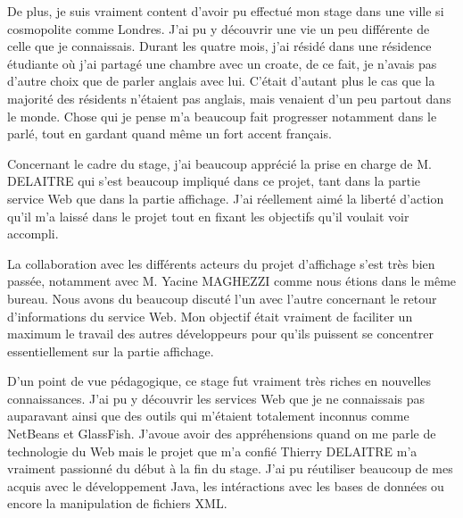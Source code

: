 De plus, je suis vraiment content d'avoir pu effectu\'e mon stage dans une ville si cosmopolite comme Londres.
J'ai pu y d\'ecouvrir une vie un peu diff\'erente de celle que je connaissais.
Durant les quatre mois, j'ai r\'esid\'e dans une r\'esidence \'etudiante o\`u j'ai partag\'e une chambre avec un croate, de ce fait, je n'avais pas d'autre choix que de parler anglais avec lui.
C'\'etait d'autant plus le cas que la majorit\'e des r\'esidents n'\'etaient pas anglais, mais venaient d'un peu partout dans le monde.
Chose qui je pense m'a beaucoup fait progresser notamment dans le parl\'e, tout en gardant quand m\^eme un fort accent fran\c{c}ais.

Concernant le cadre du stage, j'ai beaucoup appr\'eci\'e la prise en charge de M. DELAITRE qui s'est beaucoup impliqu\'e dans ce projet, tant dans la partie service Web que dans la partie affichage.
J'ai r\'eellement aim\'e la libert\'e d'action qu'il m'a laiss\'e dans le projet tout en fixant les objectifs qu'il voulait voir accompli.

La collaboration avec les diff\'erents acteurs du projet d'affichage s'est tr\`es bien pass\'ee, notamment avec M. Yacine MAGHEZZI comme nous \'etions dans le m\^eme bureau.
Nous avons du beaucoup discut\'e l'un avec l'autre concernant le retour d'informations du service Web.
Mon objectif \'etait vraiment de faciliter un maximum le travail des autres d\'eveloppeurs pour qu'ils puissent se concentrer essentiellement sur la partie affichage.

D'un point de vue p\'edagogique, ce stage fut vraiment tr\`es riches en nouvelles connaissances.
J'ai pu y d\'ecouvrir les services Web que je ne connaissais pas auparavant ainsi que des outils qui m'\'etaient totalement inconnus comme NetBeans et GlassFish.
J'avoue avoir des appr\'ehensions quand on me parle de technologie du Web mais le projet que m'a confi\'e Thierry DELAITRE m'a vraiment passionn\'e du d\'ebut \`a la fin du stage.
J'ai pu r\'eutiliser beaucoup de mes acquis avec le d\'eveloppement Java, les int\'eractions avec les bases de donn\'ees ou encore la manipulation de fichiers XML.



\clearpage
